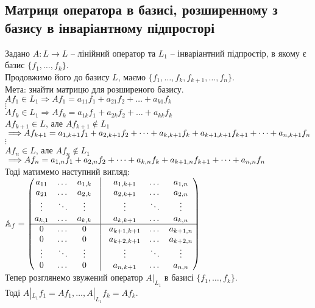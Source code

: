 \documentclass[a4paper, 10pt]{article}
\theoremstyle{theoremdd}
\begin{document}
\subsection{Матриця оператора в базисі, розширенному з базису в інваріантному підпросторі}
Задано $A \colon L \to L$ -- лінійний оператор та $L_1$ -- інваріантний підпростір, в якому є базис $\{f_1,\dots, f_k\}$.\\
Продовжимо його до базису $L$, маємо $\{f_1,\dots,f_k,f_{k+1},\dots,f_n\}$. \\
Мета: знайти матрицю для розширеного базису.\\
$Af_1 \in L_1 \Rightarrow Af_1 = a_{11}f_1 + a_{21}f_2 + \dots + a_{k1}f_k$\\
$\vdots$\\
$Af_k \in L_1 \Rightarrow Af_k = a_{1k}f_1 + a_{2k}f_2 + \dots + a_{kk}f_k$\\
$Af_{k+1} \in L $, але $Af_{k+1} \notin L_1$ $\implies \\ Af_{k+1} = a_{1,k+1}f_1 + a_{2,k+1}f_2 + \dots + a_{k,k+1}f_k + a_{k+1,k+1}f_{k+1} + \dots + a_{n,k+1}f_n$\\
$\vdots$\\
$Af_n \in L $, але $Af_n \notin L_1$ $\implies \\ Af_n = a_{1,n}f_1 + a_{2,n}f_2 + \dots + a_{k,n}f_k + a_{k+1,n}f_{k+1} + \dots + a_{n,n}f_n$\\
Тоді матимемо наступний вигляд:\\
$\mathbb{A}_f = \begin{pmatrix}
a_{11} & \dots & a_{1,k} & \vline & a_{1,k+1} & \dots & a_{1, n} \\
a_{21} & \dots & a_{2,k} & \vline & a_{2,k+1} & \dots & a_{2, n} \\
\vdots & \ddots & \vdots & \vline & \vdots & \ddots & \vdots \\
a_{k,1} & \dots & a_{k,k} & \vline & a_{k,k+1} & \dots & a_{k, n} \\
\hline
0 & \dots & 0 & \vline & a_{k+1,k+1} & \dots & a_{k+1, n} \\
0 & \dots & 0 & \vline & a_{k+2,k+1} &  \dots & a_{k+2, n} \\
\vdots & \ddots & \vdots & \vline & \vdots & \ddots & \vdots \\
0 & \dots & 0 & \vline & a_{n,k+1} & \dots & a_{n, n} \\
\end{pmatrix}$
\bigskip \\
Тепер розглянемо звужений оператор $A|_{L_1}$ в базисі $\{f_1,\dots,f_k\}$.\\ Тоді $A|_{L_1} f_1 = Af_1 , \dots, A|_{L_1}f_k = Af_k$.\\
\end{document}
